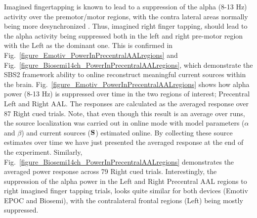 \documentclass[10pt]{article}
\begin{document}
Imagined fingertapping is known to lead to a suppression of the alpha (8-13 Hz) activity over the premotor/motor regions, with the contra lateral areas normally being more desynchronized \cite{pfurtscheller1999event}. Thus, imagined right finger tapping, should lead to the alpha activity being suppressed both in the left and right pre-motor region with the Left as the dominant one.
This is confirmed in Fig.~\ref{figure_Emotiv_PowerInPrecentralAALregions} and Fig.~\ref{figure_Biosemi14ch_PowerInPrecentralAALregions}, which demonstrate the SBS2 framework ability to online reconstruct meaningful current sources within the brain. Fig.~\ref{figure_Emotiv_PowerInPrecentralAALregions} shows how alpha power (8-13 Hz) is suppressed over time in the two regions of interest; Precentral Left and Right AAL. The responses are calculated as the averaged response over 87 Right cued trials. Note, that even though this result is an average over runs, the source localization was carried out in online mode with model parameters ($\alpha$ and $\beta$) and current sources ($\bf S$) estimated online. By collecting these source estimates over time we have just presented the averaged response at the end of the experiment. Similarly, Fig.~\ref{figure_Biosemi14ch_PowerInPrecentralAALregions} demonstrates the averaged power response across 79 Right cued trials.
Interestingly, the suppression of the alpha power in the Left and Right Precentral AAL regions to right imagined finger tapping trials, looks quite similar for both devices (Emotiv EPOC and Biosemi), with the contralateral frontal regions (Left) being mostly suppressed.
\iffalse{
Similarly, a left imagined fingertapping cue leads to more suppressed alpha activity of right frontal regions during task execution as demonstrated in Fig.~\ref{figure_Emotiv_3Dsourcerecon_Trial190Left_6timepoints}. Additionally, the figure shows how the alpha power in the end of the trial is recovering to its initial state.
}\fi

\iffalse{
We here explore the SBS2 framework ability to adaptive estimating the model parameters $\alpha$ and $\beta$, which determines the overall regularization of the source solution, $\lambda = \frac{\alpha}{\beta}$. Figure~\ref{figure_3Dbrain_hyperparameters} demonstrate online estimation of the model parameters $\alpha$ and $\beta$, the signal-to-noise ratio (SNR), and the regularization $\lambda$.
\begin{figure}[!t]
\centering
\texttt{[image: figures/Emotiv\_MN8\_13Hz\_OnlineTrack\_Regularization\_Zoom.png]}
\caption{Adaptive estimation of regularization term - \comment{CS}{Note we actually update the hyperparameters more often here than on on the phone/tablet - should we leave the figure or take it out?}}
\label{figure_3Dbrain_hyperparameters}
\end{figure}
}\fi
\end{document}
